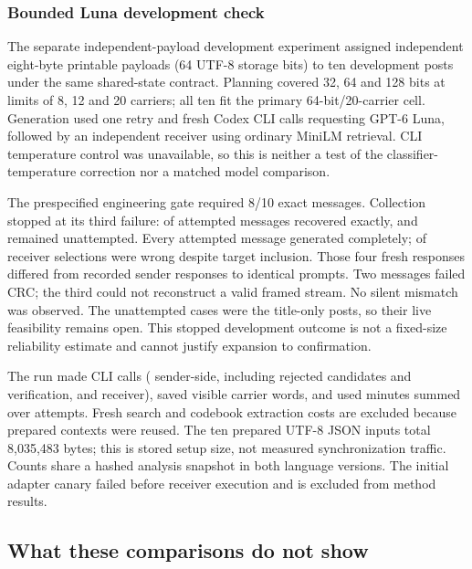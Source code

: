 \subsubsection{Bounded Luna development check}
The separate independent-payload development experiment assigned independent eight-byte printable payloads (64 UTF-8 storage bits) to ten development posts under the same shared-state contract. Planning covered 32, 64 and 128 bits at limits of 8, 12 and 20 carriers; all ten fit the primary 64-bit/20-carrier cell. Generation used one retry and fresh Codex CLI calls requesting GPT-6 Luna, followed by an independent receiver using ordinary MiniLM retrieval. CLI temperature control was unavailable, so this is neither a test of the classifier-temperature correction nor a matched model comparison.

The prespecified engineering gate required 8/10 exact messages. Collection stopped at its third failure: \DevExact{} of \DevAttempted{} attempted messages recovered exactly, and \DevUnattempted{} remained unattempted. Every attempted message generated completely; \DevWrong{} of \DevFrames{} receiver selections were wrong despite target inclusion. Those four fresh responses differed from recorded sender responses to identical prompts. Two messages failed CRC; the third could not reconstruct a valid framed stream. No silent mismatch was observed. The unattempted cases were the title-only posts, so their live feasibility remains open. This stopped development outcome is not a fixed-size reliability estimate and cannot justify expansion to confirmation.

The run made \DevCalls{} CLI calls (\DevSenderCalls{} sender-side, including rejected candidates and verification, and \DevReceiverCalls{} receiver), saved \DevWords{} visible carrier words, and used \DevMinutes{} minutes summed over attempts. Fresh search and codebook extraction costs are excluded because prepared contexts were reused. The ten prepared UTF-8 JSON inputs total 8,035,483 bytes; this is stored setup size, not measured synchronization traffic. Counts share a hashed analysis snapshot in both language versions. The initial adapter canary failed before receiver execution and is excluded from method results.


\FloatBarrier

\FloatBarrier


\subsection{What these comparisons do not show}

